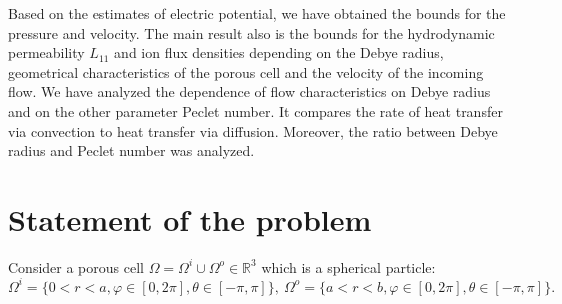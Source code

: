 \documentclass{amsart}
\begin{document}
Based on the estimates of electric potential, we have obtained the bounds for the pressure and velocity.
The main result also is the bounds for the hydrodynamic permeability $L_{11}$ and ion flux densities depending on the Debye radius, geometrical characteristics of the porous cell and the velocity of the incoming flow. We have analyzed the dependence of flow characteristics on Debye radius and on the other parameter Peclet number. It compares the rate of heat transfer via convection to heat transfer via diffusion. Moreover, the ratio between Debye radius and Peclet number was analyzed.

\section{Statement of the problem}

Consider a porous cell $\Omega=\Omega^i\cup\Omega^o\in \mathbb{R}^3$ which  is a spherical particle:
$$\Omega^i=\{ 0<r<a, \varphi\in[0,2\pi], \theta\in[-\pi,\pi]\},\ \Omega^o=\{ a<r<b, \varphi\in[0,2\pi], \theta\in[-\pi,\pi]\}.$$
\end{document}

